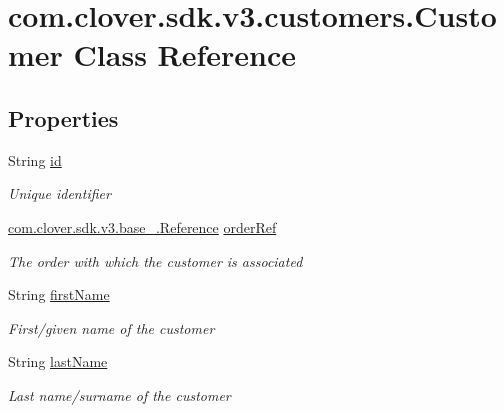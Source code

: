 \hypertarget{classcom_1_1clover_1_1sdk_1_1v3_1_1customers_1_1_customer}{}\section{com.\+clover.\+sdk.\+v3.\+customers.\+Customer Class Reference}
\label{classcom_1_1clover_1_1sdk_1_1v3_1_1customers_1_1_customer}
\subsection*{Properties}
\begin{DoxyCompactItemize}
\item 
String \hyperlink{classcom_1_1clover_1_1sdk_1_1v3_1_1customers_1_1_customer_ae89ac2e49aed55ec79af53509019e6ac}{id}
\begin{DoxyCompactList}\small\item\em Unique identifier \end{DoxyCompactList}\item 
\hyperlink{classcom_1_1clover_1_1sdk_1_1v3_1_1base___1_1_reference}{com.\+clover.\+sdk.\+v3.\+base\+\_\+.\+Reference} \hyperlink{classcom_1_1clover_1_1sdk_1_1v3_1_1customers_1_1_customer_aba176d2a5bcfbcc4c80ade1c9e27274e}{order\+Ref}
\begin{DoxyCompactList}\small\item\em The order with which the customer is associated \end{DoxyCompactList}\item 
String \hyperlink{classcom_1_1clover_1_1sdk_1_1v3_1_1customers_1_1_customer_aa7db9c2d514de4fa061f9a2a0e254f4e}{first\+Name}
\begin{DoxyCompactList}\small\item\em First/given name of the customer \end{DoxyCompactList}\item 
String \hyperlink{classcom_1_1clover_1_1sdk_1_1v3_1_1customers_1_1_customer_a1d4af2b88dc68eb3456a557a41dc36b5}{last\+Name}
\begin{DoxyCompactList}\small\item\em Last name/surname of the customer \end{DoxyCompactList}\item 

\end{DoxyCompactItemize}
